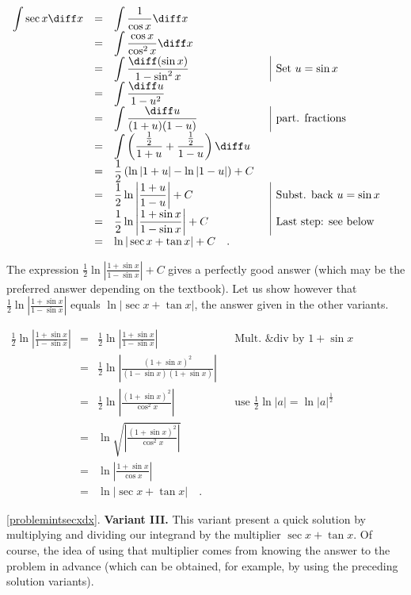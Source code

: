 {$\begin{array}{rcll|l}
\displaystyle \int \sec x \diff x&=&\displaystyle \int \frac{1}{\cos x}\diff x\\
&=&\displaystyle \int \frac{\cos x}{\cos^2x}\diff x\\
&=&\displaystyle \int \frac{\diff (\sin x)}{1-\sin^2x}&&\text{Set }u=\sin x\\
&=&\displaystyle \int \frac{\diff u}{1-u^2}\\
&=&\displaystyle \int \frac{\diff u}{(1+u)(1-u)}&&\text{part. fractions}\\
&=&\displaystyle \int \left(\frac{\frac{1}{2}}{1+u} +\frac{ \frac{1}{ 2}}{1 -u} \right)\diff u \\
&=&\displaystyle \frac{1}{2}\left(\ln |1+u|-\ln|1-u| \right)+C\\
&=&\displaystyle \frac{1}{2}\ln \left|\frac{1+u}{1-u} \right|+C &&\text{Subst. back } u=\sin x \\
&=&\displaystyle \frac{1}{2} \ln \left|\frac{1+\sin x}{1-\sin x}\right|+C&&\text{Last step: see below}\\
&=&\displaystyle \ln|\sec x+\tan x|+C\quad .
\end{array}
$

The expression $\displaystyle \frac{1}{2} \ln \left|\frac{1+\sin x}{1-\sin x}\right|+C$ gives a perfectly good answer (which may be the preferred answer depending on the textbook). Let us show however that $\displaystyle \frac{1}{2} \ln \left|\frac{1+\sin x}{1-\sin x}\right|$ equals $\displaystyle \ln |\sec x+\tan x|$, the answer given in the other variants.

$\begin{array}{rcll|l}
\displaystyle \frac{1}{2}  \ln \left|\frac{1+\sin x}{1-\sin x}\right|&=&\displaystyle  \frac{1}{2} \ln \left|\frac{1+\sin x}{1-\sin x}\right| &&\text{Mult. \& div by } 1+\sin x\\
&=&\displaystyle \frac{1}{2}\ln \left|\frac{(1+\sin x)^2}{(1-\sin x)(1+\sin x)}\right|\\
&=&\displaystyle \frac{1}{2}\ln \left|\frac{(1+\sin x)^2}{\cos^2x}\right|&& \text{use }\frac{1}{2}\ln |a|= \ln |a|^{\frac{1}{2}}\\
&=&\displaystyle \ln \sqrt{\left|\frac{(1+\sin x)^2}{\cos^2x}\right|}\\
&=&\displaystyle \ln \left|\frac{1+\sin x}{\cos x}\right|\\
&=&\displaystyle \ln |\sec x +\tan x|\quad .
\end{array}
$

\ref{problemintsecxdx}. \textbf{Variant III. } This variant present a quick solution by multiplying and dividing our integrand by the multiplier $\sec x+\tan x$. Of course, the idea of using that multiplier comes from knowing the answer to the problem in advance (which can be obtained, for example, by using the preceding solution variants).

}
